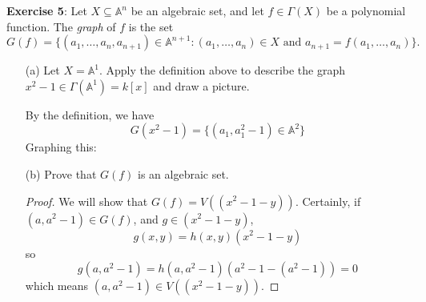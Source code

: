 \documentclass{article}
\begin{document}
\textbf{Exercise 5}: Let $X \subseteq \mathbb{A}^{n}$ be an algebraic set, and let $f \in \Gamma(X)$ be a polynomial function. The \textit{graph} of $f$ is the set
    \begin{equation*}
        G(f) = \{(a_{1}, \ldots , a_{n}, a_{n + 1}) \in \mathbb{A}^{n + 1} : (a_{1}, \ldots , a_{n}) \in X \text{ and } a_{n + 1} = f(a_{1}, \ldots , a_{n})\}.
    \end{equation*}
        \begin{itemize}
            \item [(a)] Let $X = \mathbb{A}^{1}.$ Apply the definition above to describe the graph $x^{2} - 1 \in \Gamma(\mathbb{A}^{1}) = k[x]$ and draw a picture.
                \begin{answer}
                    By the definition, we have
                        \begin{equation*}
                            G(x^{2} - 1) = \{(a_{1}, a_{1}^{2} - 1) \in \mathbb{A}^{2}\}
                        \end{equation*}
                    Graphing this:
                            \begin{center}
                            \end{center}
                \end{answer}

            \item [(b)] Prove that $G(f)$ is an algebraic set.
                \begin{proof}
                    We will show that $G(f) = V((x^{2} - 1 - y))$. Certainly, if $(a, a^{2} - 1) \in G(f)$, and $g \in (x^{2} - 1 - y)$,
                        \begin{equation*}
                            g(x, y) = h(x, y)(x^{2} - 1 - y)
                        \end{equation*}
                    so
                        \begin{equation*}
                            g(a, a^{2} - 1) = h(a, a^{2} - 1) (a^{2} - 1 - (a^{2} - 1)) = 0
                        \end{equation*}
                    which means $(a, a^{2} - 1) \in V((x^{2} - 1 - y))$. 


\end{proof}
\end{itemize}
\end{document}
